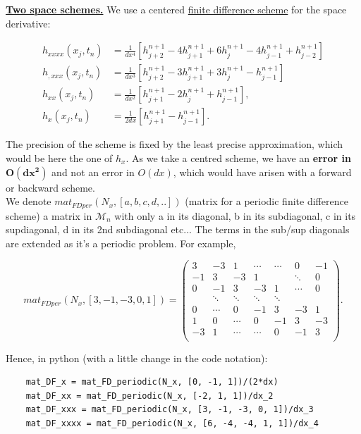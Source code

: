 \documentclass[12pt]{article}
\begin{document}
\underline{\textbf{Two space schemes.}}
We use a centered \underline{finite difference scheme} for the space derivative: 

\begin{equation}
\begin{aligned}
    h_{xxxx}(x_j, t_n) &= \frac{1}{dx^4}[h_{j+2}^{n+1} -4h_{j+1}^{n+1} +6h_{j}^{n+1} - 4h_{j-1}^{n+1} + h_{j-2}^{n+1}]\\   
    h_{,xxx}(x_j,t_n)&=\frac{1}{dx^3}[h^{n+1}_{j+2}-3h^{n+1}_{j+1} +3h^{n+1}_{j}-h^{n+1}_{j-1}]\\
  h_{xx}(x_j, t_n) &= \frac{1}{dx^2}[h_{j+1}^{n+1} -2h_{j}^{n+1} +h_{j-1}^{n+1}],\\ 
  h_{x}(x_j, t_n) &= \frac{1}{2dx}[h_{j+1}^{n+1} -h_{j-1}^{n+1}] . 
\end{aligned}
\end{equation}

The precision of the scheme is fixed by the least precise approximation, which would be here the one of $h_x$. As we take a 
centred scheme, we have an \textbf{error in }$\boldsymbol{O(dx^2 )}$ and not an error in $O(dx)$, which would have 
arisen with a forward or backward scheme. \\

We denote $ mat_{FDper}(N_x, [a, b, c, d,..])$ (matrix for a periodic finite difference scheme) a matrix in $\mathcal{M}_n$ with only a in its diagonal, b in its subdiagonal, c in its supdiagonal, d in its 2nd subdiagonal etc... The terms in the sub/sup diagonals are extended as it's a periodic problem. For example, 

\begin{equation}
mat_{FDper}(N_x, [3, -1, -3,0,1]) = \begin{pmatrix} 3&-3&1&\cdots&\cdots&0&-1\\-1&3&-3&1&&\ddots&0\\0&-1&3&-3&1&\cdots&0\\&\ddots&\ddots&\ddots&\ddots&\\0&\cdots&0&-1&3&-3&1\\1&0&\cdots&0&-1&3&-3\\-3&1&\cdots&\cdots&0&-1&3\\\end{pmatrix}.
\end{equation}


Hence, in python (with a little change in the code notation): 
\begin{verbatim}
    mat_DF_x = mat_FD_periodic(N_x, [0, -1, 1])/(2*dx)
    mat_DF_xx = mat_FD_periodic(N_x, [-2, 1, 1])/dx_2
    mat_DF_xxx = mat_FD_periodic(N_x, [3, -1, -3, 0, 1])/dx_3
    mat_DF_xxxx = mat_FD_periodic(N_x, [6, -4, -4, 1, 1])/dx_4
\end{verbatim}
\end{document}
